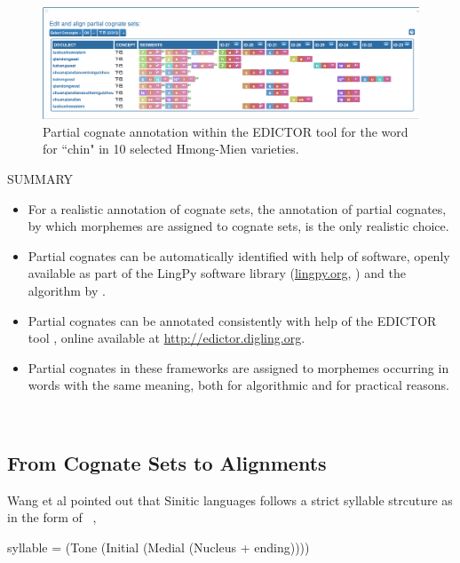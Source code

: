 \documentclass[xetex,svgnames]{scrartcl}
\begin{document}
\begin{figure}
  \centering
  \includegraphics[width=\textwidth]{partial-cognates.png}
  \caption{Partial cognate annotation within the EDICTOR tool for the word for ``chin" in 10
  selected Hmong-Mien varieties.}
  \label{fig:edipart}
\end{figure}

\begin{center}
  \hline
  SUMMARY \\\hline
  \begin{itemize}
    \item For a realistic annotation of cognate sets, the annotation of partial cognates, by which
      morphemes are assigned to cognate sets, is the only realistic choice.
    \item Partial cognates can be automatically identified with help of software, openly available
      as part of the LingPy software library (\url{lingpy.org}, \citealt{List2018i}) and the
      algorithm by \citet{List2016g}.
    \item Partial cognates can be annotated consistently with help of the EDICTOR tool
      \citep{List2017d}, online available at \url{http://edictor.digling.org}.
    \item Partial cognates in these frameworks are assigned to morphemes occurring in words with the
      same meaning, both for algorithmic and for practical reasons.
  \end{itemize}\\\hline
  \endtabular
\end{center}

\subsection{From Cognate Sets to Alignments}
Wang et al pointed out that Sinitic languages follows a strict syllable strcuture as in the form of ~\citep{Wang1996}, 

\begin{displayquote}
syllable = (Tone (Initial (Medial (Nucleus + ending))))  
\end{displayquote}
\end{document}
